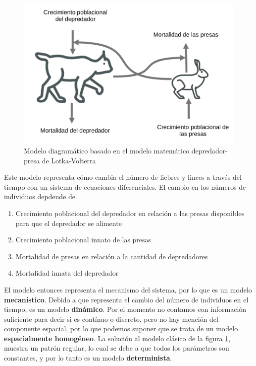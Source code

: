 \documentclass[
]{book}
\providecommand{\tightlist}{%
  \setlength{\itemsep}{0pt}\setlength{\parskip}{0pt}}
\begin{document}
\begin{figure}

{\centering \includegraphics[width=12.18in]{Unidad-I/Volterra/Volterra} 

}

\caption{Modelo diagramático basado en el modelo matemático depredador-presa de Lotka-Volterra}\label{fig:volterra-diag}
\end{figure}

Este modelo representa cómo cambia el número de liebres y linces a través del tiempo con un sistema de ecuaciones diferenciales. El cambio en los números de individuos depdende de

\begin{enumerate}
\def\labelenumi{\arabic{enumi}.}
\tightlist
\item
  Crecimiento poblacional del depredador en relación a las presas disponibles para que el depredador se alimente
\item
  Crecimiento poblacional innato de las presas
\item
  Mortalidad de presas en relación a la cantidad de depredadores
\item
  Mortalidad innata del depredador
\end{enumerate}

El modelo entonces representa el mecanismo del sistema, por lo que es un modelo \textbf{mecanístico}. Debido a que representa el cambio del número de individuos en el tiempo, es un modelo \textbf{dinámico}. Por el momento no contamos con información suficiente para decir si es contínuo o discreto, pero no hay mención del componente espacial, por lo que podemos suponer que se trata de un modelo \textbf{espacialmente homogéneo}. La solución al modelo clásico de la figura \ref{fig:volterra-diag}, muestra un patrón regular, lo cual se debe a que todos los parámetros son constantes, y por lo tanto es un modelo \textbf{determinista}.
\end{document}
